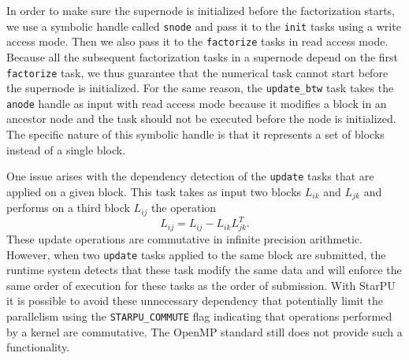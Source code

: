 \documentclass{article}
\begin{document}
In order to make sure the supernode is initialized before the
factorization starts, we use a symbolic handle called \texttt{snode}
and pass it to the \texttt{init} tasks using a write access mode. Then
we also pass it to the \texttt{factorize} tasks in read access
mode. Because all the subsequent factorization tasks in a supernode
depend on the first \texttt{factorize} task, we thus guarantee that the
numerical task cannot start before the supernode is initialized. For
the same reason, the \texttt{update\_btw} task takes the
\texttt{anode} handle as input with read access mode because it
modifies a block in an ancestor node and the task should not be
executed before the node is initialized. The specific nature of this
symbolic handle is that it represents a set of blocks instead of a
single block.

One issue arises with the dependency detection of the \texttt{update}
tasks that are applied on a given block. This task takes as input two
blocks $L_{ik}$ and $L_{jk}$ and performs on a third block $L_{ij}$ the
operation
\begin{equation*}
  L_{ij} = L_{ij} - L_{ik}L_{jk}^{T}.
\end{equation*}
These update operations are commutative in infinite precision arithmetic. 
However, when two
\texttt{update} tasks applied to the same block are submitted, the
runtime system detects that these task modify the same data and will
enforce the same order of execution for these tasks as the order of
submission. With StarPU it is possible to avoid these unnecessary
dependency that potentially limit the parallelism using the
\texttt{STARPU\_COMMUTE} flag indicating that operations performed by
a kernel are commutative. The OpenMP standard still does not provide
such a functionality.
\end{document}
